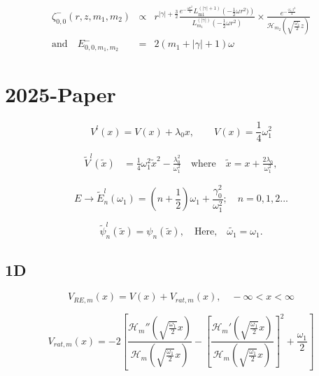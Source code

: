 \documentclass[12pt]{article}
\newcommand{\td}[1]{\tilde{#1}}
\begin{document}
\begin{eqnarray}
\zeta_{0,0}^-(r,z,m_1,m_2)&\propto& r^{|\gamma| +\frac{3}{2}}  \frac{e^{-\frac{\omega r^2}{4}}L_{\text{m1}}^{(| \gamma | +1)}\left(-\frac{1}{2}\omega r^2)\right)}{L_{m_1}^{(|\gamma |)}\left(-\frac{1}{2}\omega r^2 \right)}\times
\frac{e^{-\frac{\omega_z\;  z^2}{4}}}{\mathcal{H}_{m_2}^{}\left(\sqrt{\frac{\omega_z}{2}}  z \right)}  \nonumber\\
\mbox{and} \quad E^-_{0,0,m_1,m_2}&=&2(m_1+|\gamma|+1)\omega
\end{eqnarray}













\newpage
\section*{2025-Paper}

\begin{equation}\label{1D-V-I}
V^{l}(x) =V(x) + \lambda_0 x ,\qquad V(x)=\frac{1}{4}\omega_1^2 
\end{equation}

\begin{align}\label{1D-V'}
\td{V}^l(\td{x}) &= \frac{1}{4}\omega_1^2 \td{x}^2 - \frac{\lambda_0^2}{\omega_1^2}\quad\mbox{where}\quad \td{x} = x + \frac{2\lambda_0}{ \omega_1^2},
\end{align}

\begin{equation}
	E\rightarrow \tilde{E}_n^l(\omega_1)=\left(n+\frac{1}{2}\right) \omega_1+\frac{\gamma^2_0}{\omega^2_1};\quad n=0,1,2...
\end{equation} 

\begin{equation}\label{1D-psi}
  \td{\psi}_n^l(\td{x})=\psi_n(\td{x}),\quad\text{Here,}\quad \td{\omega_1}=\omega_1.
\end{equation}


\subsection*{1D}
\begin{equation}\label{1D-V-RE-x}
  V_{RE,m}(x) = V(x) + V_{rat,m}\left(x\right), \quad -\infty < x < \infty
\end{equation}

\begin{equation}\label{rat}
    V_{rat,m}(x)=-2\left[\frac{\mathcal{H}_m''\left(\sqrt{\frac{\omega_1}{2}} x\right)}{\mathcal{H}_m\left(\sqrt{\frac{\omega_1}{2}} x\right)} - \left[\frac{\mathcal{H}_m'\left(\sqrt{\frac{\omega_1}{2}} x\right)}{\mathcal{H}_m\left(\sqrt{\frac{\omega_1}{2}} x\right)}\right]^2 + \frac{\omega_1}{2}\right]
\end{equation}
\end{document}
